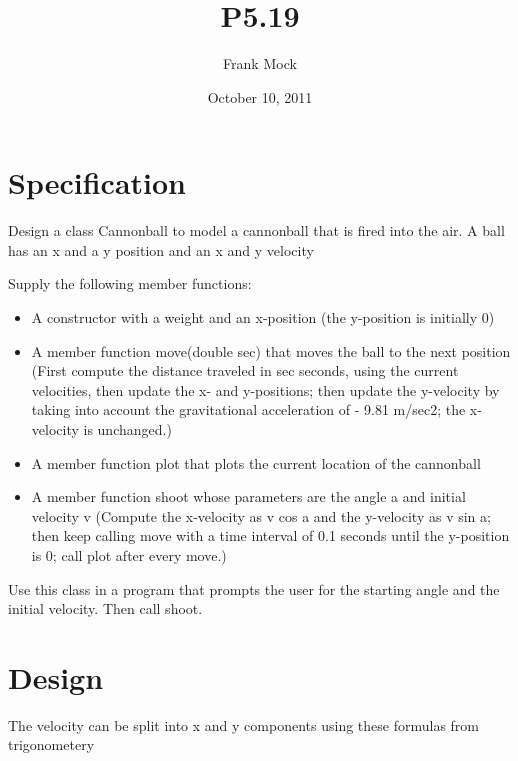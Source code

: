 \documentclass{article}
\title{\color{blue}P5.19}
\author{\color{blue}Frank Mock}
\date{\color{blue}October 10, 2011}
\begin{document}
\maketitle
\section{Specification}
	Design a class Cannonball to model a cannonball that is fired into the air. 
    A ball has an x and a y position and an x and y velocity
		
	Supply the following member functions:
		\begin{itemize}
		\item	A constructor with a weight and an x-position (the y-position is initially 0)
		\item	A member function move(double sec) that moves the ball to the next position (First compute 
                the distance traveled in sec seconds, using the current velocities, then update the x- and y-positions; 
                then update the y-velocity by taking into account the gravitational acceleration of - 9.81 m/sec2; the 
                x-velocity is unchanged.)
		\item	A member function plot that plots the current location of the cannonball
		\item	A member function shoot whose parameters are the angle a and initial velocity v 
                (Compute the x-velocity as v cos a and the y-velocity as v sin a; then keep calling move with a time 
                interval of 0.1 seconds until the y-position is 0; call plot after every move.)
		\end{itemize}
		
	Use this class in a program that prompts the user for the starting angle and the initial velocity. Then call shoot.

\section{Design}
The velocity can be split into x and y components using these formulas from trigonometery
\end{document}
